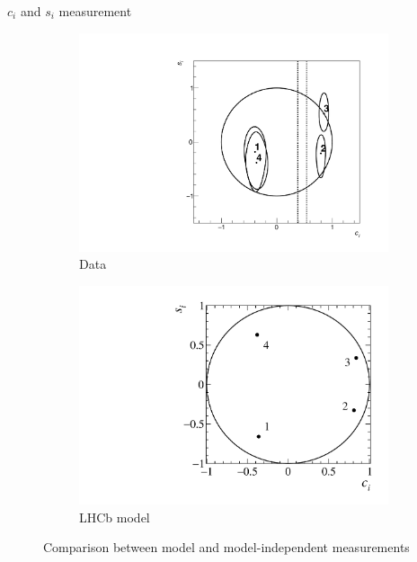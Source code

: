 \documentclass{beamer}
\begin{document}
\begin{frame}{$c_i$ and $s_i$ measurement}
  \begin{figure}
    \centering
    \begin{subfigure}{0.5\textwidth}
      \centering
      \includegraphics[width=1.0\textwidth]{Plots/Contours_cisi.pdf}
      \caption{Data}
    \end{subfigure}%
    \begin{subfigure}{0.5\textwidth}
      \centering
      \includegraphics[width=1.0\textwidth]{Plots/StrongPhaseParametersPlot_cisi_4Bins.pdf}
      \caption{LHCb model}
    \end{subfigure}
    \caption{Comparison between model and model-independent measurements}
  \end{figure}
\end{frame}
\end{document}
